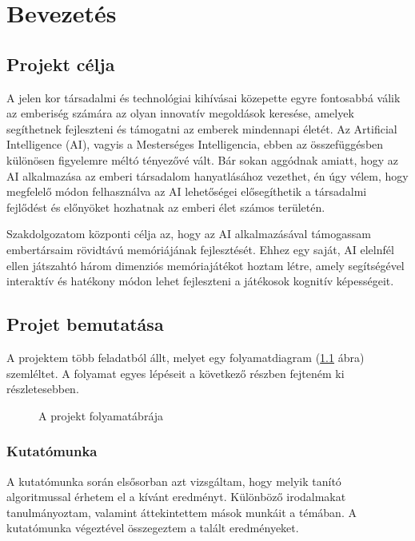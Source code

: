 \chapter{Bevezetés}
\usetikzlibrary{shapes,arrows}

\thispagestyle{fancy}
\pagestyle{fancy}
\section{Projekt célja}
A jelen kor társadalmi és technológiai kihívásai közepette egyre fontosabbá válik az emberiség számára az olyan innovatív megoldások keresése, amelyek segíthetnek fejleszteni és támogatni az emberek mindennapi életét. Az Artificial Intelligence (AI), vagyis a Mesterséges Intelligencia, ebben az összefüggésben különösen figyelemre méltó tényezővé vált. Bár sokan aggódnak amiatt, hogy az AI alkalmazása az emberi társadalom hanyatlásához vezethet, én úgy vélem, hogy  megfelelő módon felhasználva az AI lehetőségei elősegíthetik a társadalmi fejlődést és előnyöket hozhatnak az emberi élet számos területén.

Szakdolgozatom központi célja az, hogy az AI alkalmazásával támogassam embertársaim rövidtávú memóriájának fejlesztését.
Ehhez egy saját, AI elelnfél ellen játszahtó három dimenziós memóriajátékot hoztam létre, amely segítségével interaktív és hatékony módon lehet fejleszteni a játékosok kognitív képességeit. 
\section{Projet bemutatása}

A projektem több feladatból állt, melyet egy folyamatdiagram (\ref{fig:folyamat_diagram} ábra) szemléltet. A folyamat egyes lépéseit a következő részben fejteném ki részletesebben.
\begin{figure}[H]
    \centering
    
    \caption{A projekt folyamatábrája}
    \label{fig:folyamat_diagram}
\end{figure}

\subsection{Kutatómunka}
A kutatómunka során elsősorban azt vizsgáltam, hogy melyik tanító algoritmussal érhetem el a kívánt eredményt. Különböző irodalmakat tanulmányoztam, valamint áttekintettem mások munkáit a témában. A kutatómunka végeztével összegeztem a talált eredményeket.

